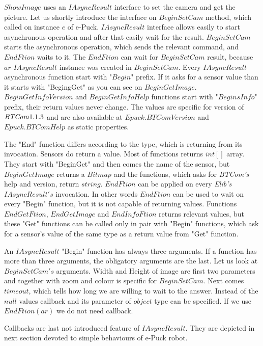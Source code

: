   $ShowImage$ uses an $IAsyncResult$ interface to set the camera and get the picture.
  Let us shortly introduce the interface on $BeginSetCam$ method, which called on instance $e$ of e-Puck.
  $IAsyncResult$ interface allows easily to start asynchronous operation and after that easily wait for the result.
  $BeginSetCam$ starts the asynchronous operation, which sends the relevant command, and $EndFtion$ waits to it.
  The $EndFtion$ can wait for $BeginSetCam$ result, because $ar$ $IAsyncResult$ instance was created in $BeginSetCam$.
  Every $IAsyncResult$ asynchronous function start with "$Begin$" prefix. 
  If it asks for a sensor value than it starts with "BegingGet" as you can see on $BeginGetImage$.
  $BeginGetInfoVersion$ and $BeginGetInfoHelp$ functions start with "$BeginsInfo$" prefix, their return values never change. 
  The values are specific for version of ${\it BTCom} 1.1.3$ and
  are also available at $Epuck.BTComVersion$ and $Epuck.BTComHelp$ as static properties.

  The "End" function differs according to the type, which is returning from its invocation.
  Sensors do  return a value. Most of functions returns $int[]$ array. They start with "BeginGet" 
  and then comes the name of the sensor, 	but $BeginGetImage$ returns a $Bitmap$ and the functions,
  which asks for {\it BTCom's} help and version, return $string$.
  $EndFtion$ can be applied on every {\it Elib's} $IAsyncResult's$ invocation. 
  In other words $EndFtion$ can be used to wait on every "Begin" function, but
  it is not capable of returning values. Functions $EndGetFtion$, $EndGetImage$ and $EndInfoFtion$ returns relevant values, but
  these "Get" functions can be called only in pair with "Begin" functions, which ask for a sensor's value 
  of the same type as a return value from "Get" function.

  An $IAsyncResult$ "Begin" function has always three arguments. If a function has more than three arguments, the obligatory arguments are the last.
  Let us look at $BeginSetCam's$ arguments. Width and Height of image are first two parameters 
  and together with zoom and colour is specific for $BeginSetCam$.
  Next comes $timeout$, which tells how long we are willing to wait to the answer. 
  Instead of the $null$ values callback and its parameter of $object$ type can be specified.
  If we use $EndFtion(ar)$ we do not need callback.

  Callbacks are last not introduced feature of $IAsyncResult$. They are depicted in next section devoted to simple behaviours of e-Puck robot.
